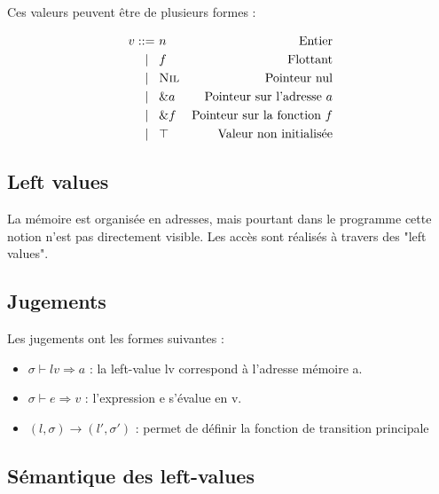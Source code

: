 Ces valeurs peuvent être de plusieurs formes :

\begin{align*}
v  ::=~  & n           & \textrm{Entier}
\\ |\hspace{3mm}   & f           & \textrm{Flottant}
\\ |\hspace{3mm}   & \textsc{Nil}       & \textrm{Pointeur nul}
\\ |\hspace{3mm}   & \&a         & \textrm{Pointeur sur l'adresse $a$}
\\ |\hspace{3mm}   & \&f         & \textrm{Pointeur sur la fonction $f$}
\\ |\hspace{3mm}   & \top        & \textrm{Valeur non initialisée}
\end{align*}


\subsection{Left values}

La mémoire est organisée en adresses, mais pourtant dans le programme cette
notion n'est pas directement visible. Les accès sont réalisés à travers des
"left values".

\subsection{Jugements}

Les jugements ont les formes suivantes :

\begin{itemize}

\item $σ ⊢ lv ⇒ a$ :
  la left-value lv correspond à l'adresse mémoire a.

\item $σ ⊢ e ⇒ v$ :
  l'expression e s'évalue en v.

\item $(l, σ) \rightarrow (l', σ')$ :
  permet de définir la fonction de transition principale

\end{itemize}

\subsection{Sémantique des left-values}


